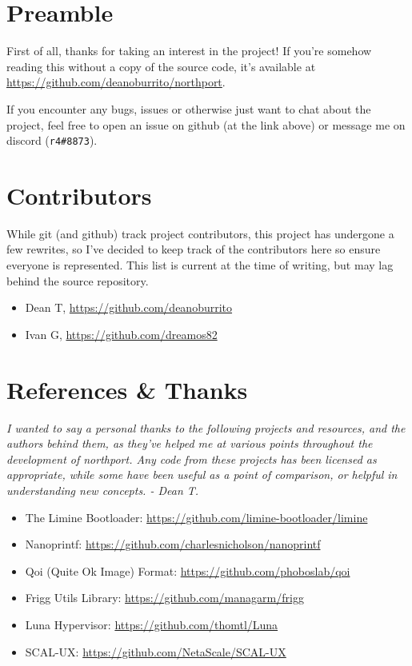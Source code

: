 \section{Preamble}
First of all, thanks for taking an interest in the project! If you're somehow reading this without a copy of the source code, it's available at \url{https://github.com/deanoburrito/northport}.

If you encounter any bugs, issues or otherwise just want to chat about the project, feel free to open an issue on github (at the link above) or message me on discord (\verb|r4#8873|).

\section{Contributors}
While git (and github) track project contributors, this project has undergone a few rewrites, so I've decided to keep track of the contributors here so ensure everyone is represented. 
This list is current at the time of writing, but may lag behind the source repository.

\begin{itemize}
    \item Dean T, \url{https://github.com/deanoburrito}
    \item Ivan G, \url{https://github.com/dreamos82}
\end{itemize}

\section{References \& Thanks}
\textit{I wanted to say a personal thanks to the following projects and resources, and the authors behind them, as they've helped me at various points throughout the development of northport. Any code from these projects has been licensed as appropriate, while some have been useful as a point of comparison, or helpful in understanding new concepts. - Dean T.}

\begin{itemize}
    \item The Limine Bootloader: \url{https://github.com/limine-bootloader/limine}
    \item Nanoprintf: \url{https://github.com/charlesnicholson/nanoprintf}
    \item Qoi (Quite Ok Image) Format: \url{https://github.com/phoboslab/qoi}
    \item Frigg Utils Library: \url{https://github.com/managarm/frigg}
    \item Luna Hypervisor: \url{https://github.com/thomtl/Luna}
    \item SCAL-UX: \url{https://github.com/NetaScale/SCAL-UX}
\end{itemize}

